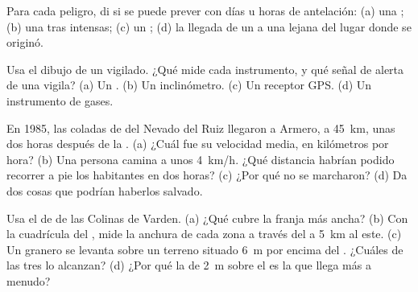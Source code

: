 \begin{exercise}[$\star$]\label{exo:g9:natural-risks:3}
Para cada peligro, di si se puede prever con días u horas de antelación:
(a) una ; (b) una  tras  intensas; (c) un
; (d) la llegada de un  a una  lejana del lugar donde
se originó.
\end{exercise}

\begin{exercise}[$\star$]\label{exo:g9:natural-risks:4}
Usa el dibujo de un  vigilado. ¿Qué mide cada instrumento, y qué
señal de alerta de una  vigila? (a) Un . (b) Un
inclinómetro. (c) Un receptor GPS. (d) Un instrumento de gases.
\end{exercise}

\begin{exercise}[$\star\star$]\label{exo:g9:natural-risks:5}
En 1985, las coladas de  del Nevado del Ruiz llegaron a Armero, a
\qty{45}{km}, unas dos horas después de la . (a) ¿Cuál fue su
velocidad media, en kilómetros por hora? (b) Una persona camina a unos
\qty{4}{km/h}. ¿Qué distancia habrían podido recorrer a pie los
habitantes en dos horas? (c) ¿Por qué no se marcharon? (d) Da dos cosas
que podrían haberlos salvado.
\end{exercise}

\begin{exercise}[$\star\star$]\label{exo:g9:natural-risks:6}
Usa el  de  de las Colinas de Varden. (a) ¿Qué 
cubre la franja más ancha? (b) Con la cuadrícula del , mide la anchura
de cada zona a través del  a \qty{5}{km} al este. (c) Un granero se
levanta sobre un terreno situado \qty{6}{m} por encima del . ¿Cuáles de
las tres  lo alcanzan? (d) ¿Por qué la  de \qty{2}{m} sobre
el  es la que llega más a menudo?
\end{exercise}

